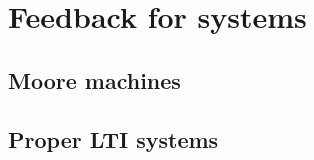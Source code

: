 
\section{Feedback for systems}
\label{sec:feedback-processes}



\subsection{Moore machines}





\subsection{Proper LTI systems}




